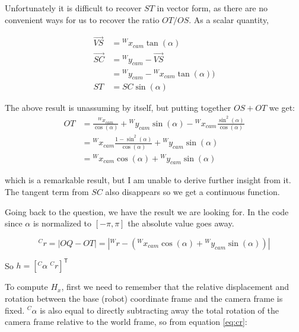 \documentclass{article}
\begin{document}
\begin{enumerate}[label=(\roman*)]
Unfortunately it is difficult to recover $ST$ in vector form, as there are no convenient ways for us to recover the ratio $OT/OS$. As a scalar quantity,

\begin{equation}
\begin{aligned}
\overrightarrow{VS}
&= {}^W x_{cam} \tan(\alpha) \\
\overrightarrow{SC}
&= {}^W y_{cam} - \overrightarrow{VS} \\
&= {}^W y_{cam} - {}^W x_{cam} \tan(\alpha)) \\
ST &= SC \sin(\alpha)
\end{aligned}
\end{equation}

The above result is unassuming by itself, but putting together $OS + OT$ we get:
\begin{equation}
\begin{aligned}
OT &= \frac{{}^W x_{cam}}{\cos(\alpha)} + {}^W y_{cam}\sin(\alpha) - {}^W x_{cam} \frac{\sin^2(\alpha)}{\cos(\alpha)} \\
&= {}^W x_{cam} \frac{1-\sin^2(\alpha)}{\cos(\alpha)} + {}^W y_{cam} \sin(\alpha) \\
&= {}^W x_{cam} \cos(\alpha) + {}^W y_{cam} \sin(\alpha)
\end{aligned}
\end{equation}

which is a remarkable result, but I am unable to derive further insight from it. The tangent term from $SC$ also disappears so we get a continuous function.

Going back to the question, we have the result we are looking for. In the code since $\alpha$ is normalized to $[-\pi, \pi]$ the absolute value goes away.

\begin{equation}
{}^C r = |OQ - OT| = | {}^W r - ({}^W x_{cam} \cos(\alpha) + {}^W y_{cam} \sin(\alpha)) |
\label{eq:cr}
\end{equation}

So $h = [{}^C\alpha \; {}^C r]^\mathsf{T}$

To compute $H_x$, first we need to remember that the relative displacement and rotation between the base (robot) coordinate frame and the camera frame is fixed. ${}^C\alpha$ is also equal to directly subtracting away the total rotation of the camera frame relative to the world frame, so from equation \ref{eq:cr}:


\end{enumerate}
\end{document}

